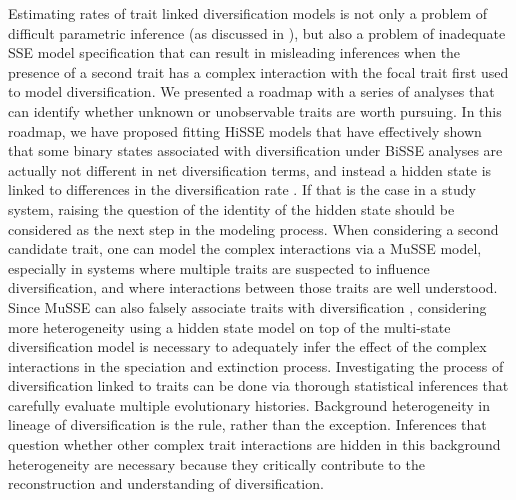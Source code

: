 

\bigskip

Estimating rates of trait linked diversification models is not only a problem of difficult parametric inference (as discussed in \citealt{rabosky_2010, beaulieu_2015}), but also a problem of inadequate SSE model specification that can result in misleading inferences when the presence of a second trait has a complex interaction with the focal trait first used to model diversification. 
We presented a roadmap with a series of analyses that can identify whether unknown or unobservable traits are worth pursuing. 
In this roadmap, we have proposed fitting HiSSE models that have effectively shown that some binary states associated with diversification under BiSSE analyses are actually not different in net diversification terms, and instead a hidden state is linked to differences in the diversification rate \citep{beaulieu_2016}.  
If that is the case in a study system, raising the question of the identity of the hidden state should be considered as the next step in the modeling process.  %
When considering a second candidate trait, one can model the complex interactions via a MuSSE model, especially in systems where multiple traits are suspected to influence diversification, and where interactions between those traits are well understood. 
Since MuSSE can also falsely associate traits with diversification \citep{fitzjohn_2012}, considering more heterogeneity using a hidden state model on top of the multi-state diversification model is necessary to adequately infer the effect of the complex interactions in the speciation and extinction process.
Investigating the process of diversification linked to traits can be done via thorough statistical inferences that carefully evaluate multiple evolutionary histories. 
Background heterogeneity in lineage of diversification is the rule, rather than the exception. 
Inferences that question whether other complex trait interactions are hidden in this background heterogeneity are necessary because they critically contribute to the reconstruction and understanding of diversification. 
